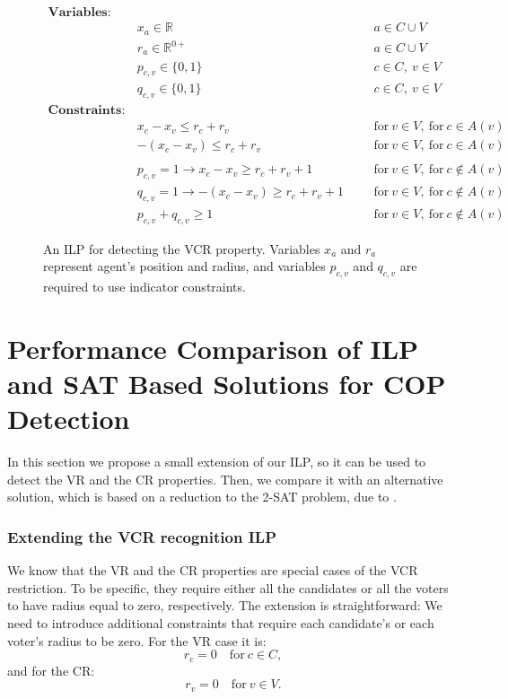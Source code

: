 \begin{figure}[H]
    \begin{align*}
        \mathbf{Variables:} & \\
        & x_a \in \mathbb{R} & & & a \in C \cup V & \\
        & r_a \in \mathbb{R}^{0+} & & & a \in C \cup V & \\
        & p_{c,v} \in \{0,1\} & & & c \in C, \: v \in V & \\
        & q_{c,v} \in \{0,1\} & & & c \in C, \: v \in V & \\
        \mathbf{Constraints:} & \\
        & x_c - x_v \leq r_c + r_v & & & \text{for} \: v \in V, \: \text{for} \: c \in A(v) & \\
        & -(x_c - x_v) \leq r_c + r_v & & & \text{for} \: v \in V, \: \text{for} \: c \in A(v) & \\
        \\
        & p_{c,v} = 1 \rightarrow x_c - x_v \geq r_c + r_v + 1 & & & \text{for} \: v \in V, \: \text{for} \: c \notin A(v) & \\
        & q_{c,v} = 1 \rightarrow -(x_c - x_v) \geq r_c + r_v + 1 & & & \text{for} \: v \in V, \: \text{for} \: c \notin A(v) & \\
        & p_{c,v} + q_{c,v} \geq 1 & & & \text{for} \: v \in V, \: \text{for} \: c \notin A(v)
    \end{align*}
\caption{An ILP for detecting the VCR property.
Variables $x_a$ and $r_a$ represent agent's position and radius,
and variables $p_{c,v}$ and $q_{c,v}$ are required to use indicator constraints.
}
\label{vcr-detection-ilp}
\end{figure}
  

\section{Performance Comparison of ILP and SAT Based Solutions for COP Detection}\label{ch3:sec3:sat}
In this section we propose a small extension of our ILP, so it can be used to detect the VR and the CR properties.
Then, we compare it with an alternative solution, which is based on a reduction to the 2-SAT problem, due to \cite{fitzsimmons-lackner-sat-cop}.

\subsubsection{Extending the VCR recognition ILP}
We know that the VR and the CR properties are special cases of the VCR restriction.
To be specific, they require either all the candidates or all the voters to have radius equal to zero, respectively.
The extension is straightforward:
We need to introduce additional constraints that require each candidate's or each voter's radius to be zero. 
For the VR case it is:
\[r_c = 0 \quad \text{for} \: c \in C,\]
and for the CR:
\[r_v = 0 \quad \text{for} \: v \in V.\]


